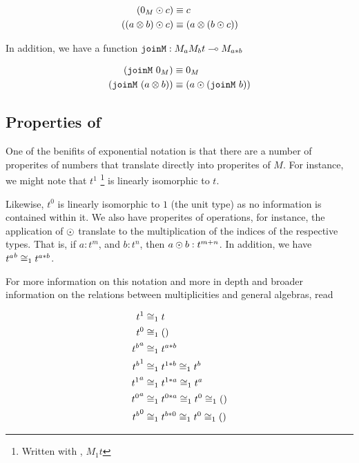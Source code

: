 \begin{definition}
	\begin{align}
		(0_M \odot c) &\equiv c \\
		((a \otimes b) \odot c) &\equiv (a \otimes (b \odot c)) 
	\end{align}
\end{definition}

In addition, we have a function $\verb|joinM| : M_a M_b t \proc M_{a * b}$

\begin{definition}
	\begin{align}
		(\mathtt{joinM} \ 0_M) &\equiv 0_M \\
		(\mathtt{joinM} \ (a \otimes b)) &\equiv (a \odot (\mathtt{joinM} \ b))
	\end{align}
\end{definition}

\subsection{Properties of \tmu}

One of the benifits of exponential notation is that there are a number of properites of numbers that translate directly into properites of $M$.
For instance, we might note that $t^1$ \footnote{Written with \tmu, $M_1 t$} is linearly isomorphic to $t$. 

Likewise, $t^0$ is linearly isomorphic to $1$ (the unit type) as no information is contained within it.
We also have properites of operations, for instance, the application of $\odot$ translate to the multiplication of the indices of the respective types.
That is, if $a : t^m$, and $b : t^n$, then $a \odot b : t^{m + n}$.
In addition, we have ${t^a}^b \cong_1 t^{a * b}$.

For more information on this notation and more in depth and broader information on the relations between multiplicities and general algebras, read 

\begin{remark}
	\label{basicMuProps}
	\begin{align}
		t^1 &\cong_1 t \\
		t^0 &\cong_1 () \\
		{t^b}^a &\cong_1 t^{a * b} \\
		{t^b}^1 &\cong_1 t^{1 * b} \cong_1 t^b \\
		{t^1}^a &\cong_1 t^{1 * a} \cong_1 t^a \\
		{t^0}^a &\cong_1 t^{0 * a} \cong_1 t^0 \cong_1 () \\
		{t^b}^0 &\cong_1 t^{b * 0} \cong_1 t^0 \cong_1 () 
	\end{align}
\end{remark}

